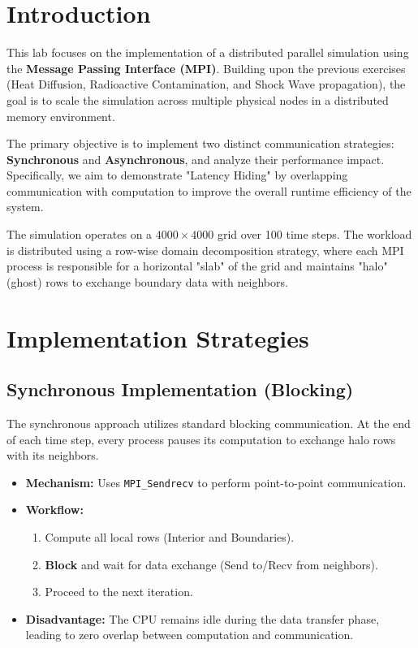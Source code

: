 \documentclass[12pt]{article}
\begin{document}

\tableofcontents
\newpage

\section{Introduction}

This lab focuses on the implementation of a distributed parallel simulation using the \textbf{Message Passing Interface (MPI)}. Building upon the previous exercises (Heat Diffusion, Radioactive Contamination, and Shock Wave propagation), the goal is to scale the simulation across multiple physical nodes in a distributed memory environment.

The primary objective is to implement two distinct communication strategies: \textbf{Synchronous} and \textbf{Asynchronous}, and analyze their performance impact. Specifically, we aim to demonstrate "Latency Hiding" by overlapping communication with computation to improve the overall runtime efficiency of the system.

The simulation operates on a $4000 \times 4000$ grid over 100 time steps. The workload is distributed using a row-wise domain decomposition strategy, where each MPI process is responsible for a horizontal "slab" of the grid and maintains "halo" (ghost) rows to exchange boundary data with neighbors.

\section{Implementation Strategies}

\subsection{Synchronous Implementation (Blocking)}
The synchronous approach utilizes standard blocking communication. At the end of each time step, every process pauses its computation to exchange halo rows with its neighbors.

\begin{itemize}
    \item \textbf{Mechanism:} Uses \texttt{MPI\_Sendrecv} to perform point-to-point communication.
    \item \textbf{Workflow:}
    \begin{enumerate}
        \item Compute all local rows (Interior and Boundaries).
        \item \textbf{Block} and wait for data exchange (Send to/Recv from neighbors).
        \item Proceed to the next iteration.
    \end{enumerate}
    \item \textbf{Disadvantage:} The CPU remains idle during the data transfer phase, leading to zero overlap between computation and communication.
\end{itemize}
\end{document}
